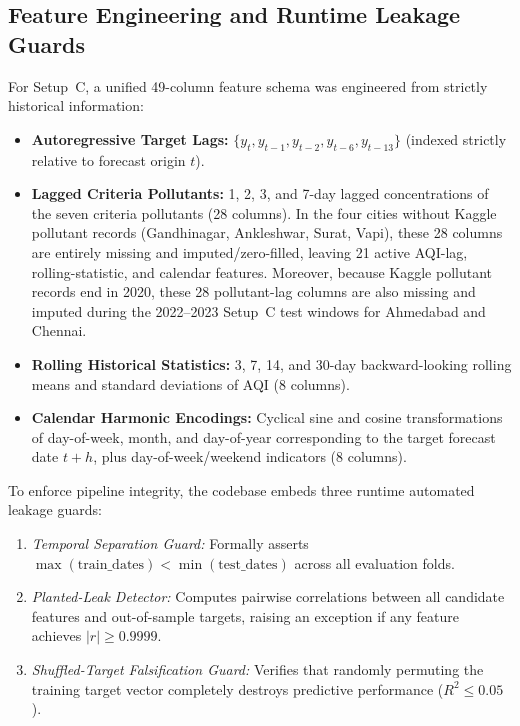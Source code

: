 \subsection{Feature Engineering and Runtime Leakage Guards}
For Setup~C, a unified 49-column feature schema was engineered from strictly historical information:
\begin{itemize}
  \item \textbf{Autoregressive Target Lags:} $\{y_t, y_{t-1}, y_{t-2}, y_{t-6}, y_{t-13}\}$ (indexed strictly relative to forecast origin $t$).
  \item \textbf{Lagged Criteria Pollutants:} 1, 2, 3, and 7-day lagged concentrations of the seven criteria pollutants (28 columns). In the four cities without Kaggle pollutant records (Gandhinagar, Ankleshwar, Surat, Vapi), these 28 columns are entirely missing and imputed/zero-filled, leaving 21 active AQI-lag, rolling-statistic, and calendar features. Moreover, because Kaggle pollutant records end in 2020, these 28 pollutant-lag columns are also missing and imputed during the 2022--2023 Setup~C test windows for Ahmedabad and Chennai.
  \item \textbf{Rolling Historical Statistics:} 3, 7, 14, and 30-day backward-looking rolling means and standard deviations of AQI (8 columns).
  \item \textbf{Calendar Harmonic Encodings:} Cyclical sine and cosine transformations of day-of-week, month, and day-of-year corresponding to the target forecast date $t+h$, plus day-of-week/weekend indicators (8 columns).
\end{itemize}

To enforce pipeline integrity, the codebase embeds three runtime automated leakage guards:
\begin{enumerate}
  \item \emph{Temporal Separation Guard:} Formally asserts $\max(\text{train\_dates}) < \min(\text{test\_dates})$ across all evaluation folds.
  \item \emph{Planted-Leak Detector:} Computes pairwise correlations between all candidate features and out-of-sample targets, raising an exception if any feature achieves $|r| \ge 0.9999$.
  \item \emph{Shuffled-Target Falsification Guard:} Verifies that randomly permuting the training target vector completely destroys predictive performance ($R^2 \le 0.05$).
\end{enumerate}

